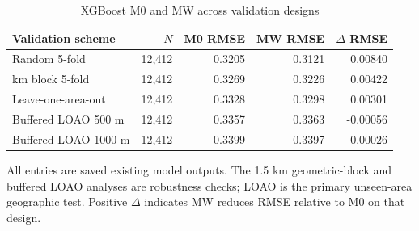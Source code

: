 \begin{table}[p]
\centering
\small
\begin{threeparttable}
\caption{XGBoost M0 and MW across validation designs}\label{tab:app-block-buffer-validation}
\begin{tabular}{>{\raggedright\arraybackslash}p{8cm}rrrr}
\toprule
Validation scheme & $N$ & M0 RMSE & MW RMSE & $\Delta$ RMSE \\
\midrule
Random 5-fold & 12,412 & 0.3205 & 0.3121 & 0.00840 \\
1.5 km block 5-fold & 12,412 & 0.3269 & 0.3226 & 0.00422 \\
Leave-one-area-out & 12,412 & 0.3328 & 0.3298 & 0.00301 \\
Buffered LOAO 500 m & 12,412 & 0.3357 & 0.3363 & -0.00056 \\
Buffered LOAO 1000 m & 12,412 & 0.3399 & 0.3397 & 0.00026 \\
\bottomrule
\end{tabular}
\begin{tablenotes}[flushleft]\footnotesize
\item All entries are saved existing model outputs. The 1.5 km geometric-block and buffered LOAO analyses are robustness checks; LOAO is the primary unseen-area geographic test. Positive $\Delta$ indicates MW reduces RMSE relative to M0 on that design.
\end{tablenotes}
\end{threeparttable}
\end{table}
